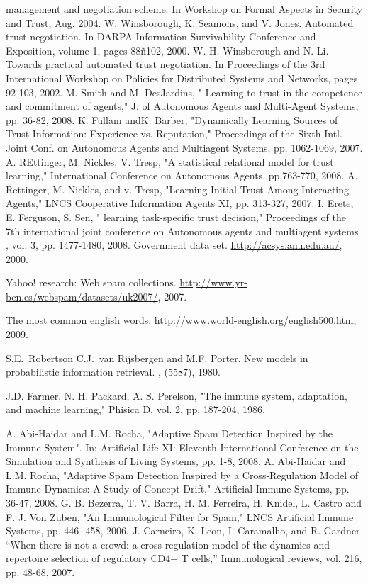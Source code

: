 \documentclass{llncs}
\begin{document}
\begin{thebibliography}{99.}
management and negotiation scheme. In Workshop on 
Formal Aspects in Security and Trust, Aug. 2004.
 W. Winsborough, K. Seamons, and V. Jones. Automated
trust negotiation. In DARPA Information Survivability Conference
and Exposition, volume 1, pages 88ñ102, 2000.
 W. H. Winsborough and N. Li. Towards practical automated
trust negotiation. In Proceedings of the 3rd International
Workshop on Policies for Distributed Systems and
Networks, pages 92-103, 2002.
 M. Smith and M. DesJardins, " Learning to trust in the competence and commitment of agents," J. of 	Autonomous Agents and Multi-Agent Systems, pp. 36-82, 2008. 
 K. Fullam andK. Barber, "Dynamically Learning Sources of Trust Information: Experience vs. Reputation," Proceedings of the Sixth Intl. Joint Conf. on Autonomous Agents and Multiagent Systems, pp. 1062-1069, 2007.
 A. REttinger, M. Nickles, V. Tresp, "A statistical relational model for trust learning," International Conference on Autonomous Agents,  pp.763-770, 2008. 
 A. Rettinger, M. Nickles, and v. Tresp,  "Learning Initial Trust Among Interacting Agents," LNCS Cooperative Information Agents XI, pp. 313-327, 2007.
 I. Erete, E. Ferguson, S. Sen, " learning task-specific trust decision," Proceedings of the 7th international joint conference on Autonomous agents and multiagent systems , vol. 3,  pp. 1477-1480, 2008.
Government data set.
\newblock \url{http://acsys.anu.edu.au/}, 2000.

Yahoo! research: Web spam collections.
\newblock \url{http://www.yr-bcn.es/webspam/datasets/uk2007/}, 2007.

The most common english words.
\newblock \url{http://www.world-english.org/english500.htm}, 2009.

S.E.~Robertson C.J.~van Rijsbergen and M.F. Porter.
\newblock New models in probabilistic information retrieval.
, (5587), 1980.

 J.D. Farmer, N. H. Packard, A. S. Perelson, "The immune system, adaptation, and machine learning," Phisica D, vol. 2, pp. 187-204, 1986. 

 A. Abi-Haidar and L.M. Rocha,  "Adaptive Spam Detection Inspired by the Immune System". In:  Artificial Life XI: Eleventh International Conference on the Simulation and Synthesis of Living Systems, pp. 1-8, 2008.
 A. Abi-Haidar and L.M. Rocha, "Adaptive Spam Detection Inspired by a Cross-Regulation Model of Immune Dynamics: A Study of Concept Drift," 	Artificial Immune Systems, pp. 36-47, 2008.
 G. B. Bezerra, T. V. Barra, H. M. Ferreira, H. Knidel, L.  Castro and F. J. Von Zuben, "An Immunological Filter for Spam," LNCS 	Artificial Immune Systems, pp. 446- 458, 2006. 
 J. Carneiro, K. Leon, I. Caramalho, and R. Gardner “When there is not a crowd: a cross regulation model of the dynamics and repertoire selection of regulatory CD4+ T cells,” Immunological reviews, vol. 216, pp. 48-68, 2007.


\end{thebibliography}

\end{document}
